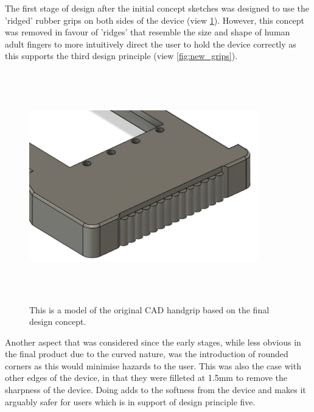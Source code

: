 The first stage of design after the initial concept sketches was designed to use the 'ridged' rubber grips on both sides of the device (view \ref{fig:old_grips}).
However, this concept was removed in favour of 'ridges' that resemble the size and shape of human adult fingers to more intuitively direct the user to hold the device correctly as this supports the third design principle (view \ref{fig:new_grips}).

\begin{figure} [h]
    \centering
    \includegraphics[width=10cm,height=10cm,keepaspectratio]{Figures/handgrip_original.png}
    \caption{This is a model of the original CAD handgrip based on the final design concept.}
    \label{fig:old_grips}
\end{figure}

Another aspect that was considered since the early stages, while less obvious in the final product due to the curved nature, was the introduction of rounded corners as this would minimise hazards to the user.
This was also the case with other edges of the device, in that they were filleted at 1.5mm to remove the sharpness of the device.
Doing adds to the softness from the device and makes it arguably safer for users which is in support of design principle five.

